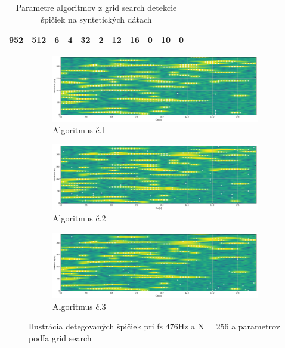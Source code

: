 \begin{table}[h]
\begin{tabular}{|c|c|ccc|cc|cccc|}
952                                                                               & 512                                                                     & \multicolumn{1}{c|}{6}           & \multicolumn{1}{c|}{4}                  & 32                & \multicolumn{1}{c|}{2}                                 & 12                                & \multicolumn{1}{c|}{16}  & \multicolumn{1}{c|}{0}   & \multicolumn{1}{c|}{10}  & 0   \\ \hline
\end{tabular}
\caption{Parametre algoritmov z grid search detekcie špičiek na syntetických dátach}
\end{table}



\begin{figure}[h]
	\centering
     \begin{subfigure}{\textwidth}
        \centering
     	\includegraphics[width=\textwidth]{figures/verification/Sythetic-FFT-A1-476-256.png}
     	\caption{Algoritmus č.1}
     \end{subfigure}
     \begin{subfigure}{\textwidth}
    	\centering
        \includegraphics[width=\textwidth]{figures/verification/Sythetic-FFT-A2-476-256.png}
        \caption{Algoritmus č.2}
     \end{subfigure}
      \begin{subfigure}{\textwidth}
    	\centering
        \includegraphics[width=\textwidth]{figures/verification/Sythetic-FFT-A3-476-256.png}
        \caption{Algoritmus č.3}
     \end{subfigure}
     \caption{Ilustrácia detegovaných špičiek pri fs 476Hz a N = 256 a parametrov podľa grid search}
\end{figure}

